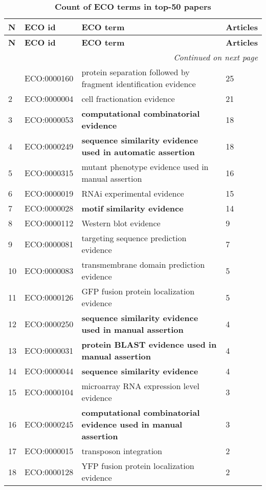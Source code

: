 \begin{longtable}[!ht]{|l||l|p{8cm}|l|}
\caption{\textbf{Count of ECO terms in top-50 papers}} \\
\hline
\textbf{N} & \textbf{ECO id} & \textbf{ECO term} & \textbf{Articles} \\ \hline
\endfirsthead
\hline
\textbf{N} & \textbf{ECO id} & \textbf{ECO term} & \textbf{Articles} \\ \hline
\endhead
\hline
\multicolumn{4}{r}{\textit{Continued on next page}} \\
\endfoot
\hline
\endlastfoot
1 & ECO:0000160 & protein separation followed by fragment identification evidence & 25\\ \hline
2 & ECO:0000004 & cell fractionation evidence & 21\\ \hline
3 & ECO:0000053 & \textbf{computational combinatorial evidence} & 18\\ \hline
4 & ECO:0000249 & \textbf{sequence similarity evidence used in automatic assertion} & 18\\ \hline
5 & ECO:0000315 & mutant phenotype evidence used in manual assertion & 16\\ \hline
6 & ECO:0000019 & RNAi experimental evidence & 15\\ \hline
7 & ECO:0000028 & \textbf{motif similarity evidence} & 14\\ \hline
8 & ECO:0000112 & Western blot evidence & 9\\ \hline
9 & ECO:0000081 & targeting sequence prediction evidence & 7\\ \hline
10 & ECO:0000083 & transmembrane domain prediction evidence & 5\\ \hline
11 & ECO:0000126 & GFP fusion protein localization evidence & 5\\ \hline
12 & ECO:0000250 & \textbf{sequence similarity evidence used in manual assertion} & 4\\ \hline
13 & ECO:0000031 & \textbf{protein BLAST evidence used in manual assertion} & 4\\ \hline
14 & ECO:0000044 & \textbf{sequence similarity evidence} & 4\\ \hline
15 & ECO:0000104 & microarray RNA expression level evidence & 3\\ \hline
16 & ECO:0000245 & \textbf{computational combinatorial evidence used in manual assertion} & 3\\ \hline
17 & ECO:0000015 & transposon integration & 2\\ \hline
18 & ECO:0000128 & YFP fusion protein localization evidence & 2\\ \hline

\end{longtable}
